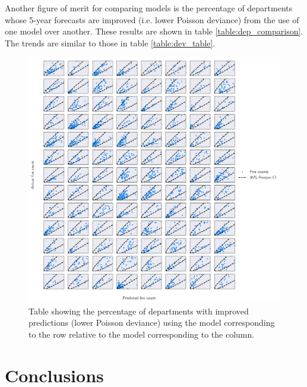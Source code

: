 \documentclass{svjour3}
\begin{document}
    Another figure of merit for comparing models is the percentage of departments whose  5-year forecasts are improved (i.e. lower Poisson deviance) from the use of one model over another. These results are shown in table \ref{table:dep_comparison}. The trends are similar to those in table \ref{table:dev_table}.
    
    \begin{figure}[htb] \centering
    \includegraphics[width=1\textwidth]{figures/dispersion.pdf}
    \caption{Table showing the percentage of departments with improved predictions (lower Poisson deviance) using the model corresponding to the row relative to the model corresponding to the column. }
    \label{fig:dispersion}
    \end{figure}
    
  
  \section{Conclusions}
  

\clearpage


\end{document}
